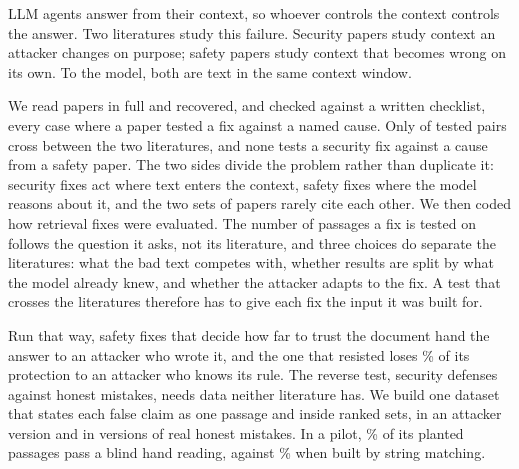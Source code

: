 LLM agents answer from their context, so whoever controls the context
controls the answer. Two literatures study this failure. Security papers
study context an attacker changes on purpose; safety papers study context that
becomes wrong on its own. To the model, both are text in the same context
window.

We read \NCorpus{} papers in full and recovered, and checked against a
written checklist, every case where a paper tested a fix against a named
cause. Only \NCrossCommunityPairs{} of
\NPureRegimePairs{} tested pairs cross between the two literatures, and none tests a security
fix against a cause from a safety paper. The two sides divide the problem rather than
duplicate it: security fixes act where text enters the context, safety fixes
where the model reasons about it, and the two sets of papers rarely cite each
other. We then coded how \NDesignFixes{} retrieval fixes were evaluated. The
number of passages a fix is tested on follows the question it asks, not its
literature, and three choices do separate the literatures: what the bad text
competes with, whether results are split by what the model already knew, and
whether the attacker adapts to the fix. A test that crosses the literatures
therefore has to give each fix the input it was built for.

Run that way, safety fixes that decide how far to trust the document hand
the answer to an attacker who wrote it, and the one that resisted loses
\PctAcdRemovedGradient{}\% of its protection to an attacker who knows its
rule. The reverse test, security defenses against honest mistakes, needs data
neither literature has. We build one dataset that states each false claim as
one passage and inside ranked sets, in an attacker version and in versions of
real honest mistakes. In a pilot, \PctSdTwoAllOk{}\% of its planted passages
pass a blind hand reading, against \PctSdOneAllOk{}\% when built by string
matching.
